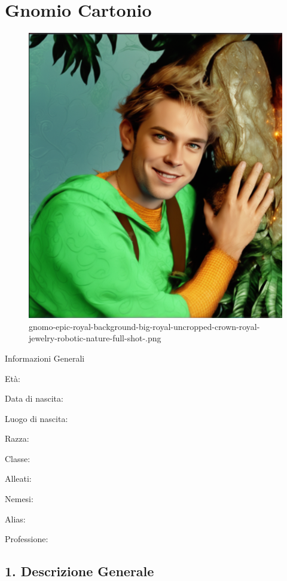 \section{Gnomio Cartonio}\label{gnomio-cartonio}


\begin{figure}
\centering
\includegraphics{gnomo-epic-royal-background-big-royal-uncropped-crown-royal-jewelry-robotic-nature-full-shot-.png}
\caption{gnomo-epic-royal-background-big-royal-uncropped-crown-royal-jewelry-robotic-nature-full-shot-.png}
\end{figure}

Informazioni Generali

Età:

Data di nascita:

Luogo di nascita:

Razza:

Classe:

Alleati:

Nemesi:

Alias:

Professione:


\subsection{1. Descrizione Generale}\label{descrizione-generale}


